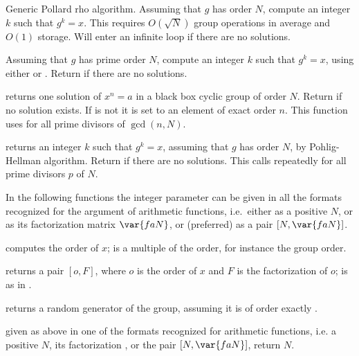  \break
Generic Pollard rho algorithm. Assuming that $g$ has order $N$, compute an
integer $k$ such that $g^k = x$. This requires $O(\sqrt{N})$ group operations
in average and $O(1)$ storage. Will enter an infinite loop if there are no
solutions.

Assuming that $g$ has prime order $N$, compute an integer $k$ such that
$g^k = x$, using either  or .
Return  if there are no solutions.

  returns one solution of $x^n = a$ in a
black box cyclic group of order $N$. Return  if no solution exists.
If  is not  it is set to an element of exact order $n$.
This function uses  for all prime divisors of $\gcd(n,N)$.

returns an integer $k$ such that $g^k = x$, assuming that $g$ has order $N$,
by Pohlig-Hellman algorithm. Return  if there are no
solutions. This calls  repeatedly for all prime divisors $p$ of
$N$.

In the following functions the integer parameter  can be given
in all the formats recognized for the argument of arithmetic functions,
i.e.~either as a positive  $N$, or as its factorization matrix
$\var{faN}$, or (preferred) as a pair $[N,\var{faN}]$.

computes the order of $x$;  is a multiple of the order, for instance
the group order.

 returns a pair $[o,F]$, where $o$ is the order of $x$ and $F$ is the
factorization of $o$;  is as in .

returns a random generator of the group, assuming it is of order exactly
.

 given  as above in one of the
formats recognized for arithmetic functions, i.e. a positive
 $N$, its factorization , or the pair $[N, \var{faN}]$,
return $N$.

